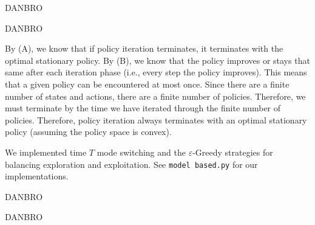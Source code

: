 \documentclass[solution, letterpaper]{cs121}
\begin{document}

\subproblem{} %
DANBRO

\subproblem{} %
DANBRO

\subproblem{} %
By (A), we know that if policy iteration terminates, it terminates with the optimal stationary policy. By (B), we know that the policy improves or stays that same after each iteration phase (i.e., every step the policy improves). This means that a given policy can be encountered at most once. Since there are a finite number of states and actions, there are a finite number of policies. Therefore, we must terminate by the time we have iterated through the finite number of policies. Therefore, policy iteration always terminates with an optimal stationary policy (assuming the policy space is convex).



\subproblem{} %
We implemented time $T$ mode switching and the $\varepsilon$-Greedy strategies for balancing exploration and exploitation. See {\tt model based.py} for our implementations.

\subproblem{} %
DANBRO

\subproblem{} %
DANBRO
\end{document}
